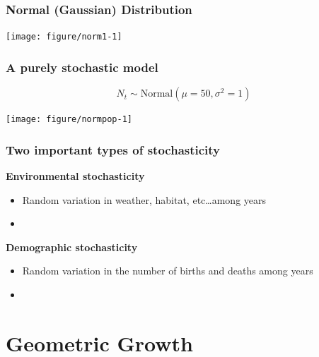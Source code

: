 \documentclass[color=usenames,dvipsnames]{beamer}\usepackage[]{graphicx}\usepackage[]{color}
\begin{document}
\begin{frame}[fragile]
  \frametitle{Normal (Gaussian) Distribution}
  \vspace{-0.7cm}
  \begin{center}

  \end{center}
\texttt{[image: figure/norm1-1]}
\end{frame}





\begin{frame}[fragile]
  \frametitle{A purely stochastic model}
  \vspace{-3mm}
  \[
    N_t \sim \mbox{Normal}(\mu=50, \sigma^2=1)
  \]
  \vspace{-8mm}

\begin{center}
  \texttt{[image: figure/normpop-1]}
\end{center}
\end{frame}



\begin{frame}
  \frametitle{Two important types of stochasticity}
  {\bf Environmental stochasticity}
  \begin{itemize}
    \item Random variation in weather, habitat, etc\dots among years
    \item[]
  \end{itemize}
  \pause
  {\bf Demographic stochasticity}
  \begin{itemize}
    \item Random variation in the number of births and deaths among years
    \item[]
  \end{itemize}
\end{frame}







\section{Geometric Growth}
\end{document}
